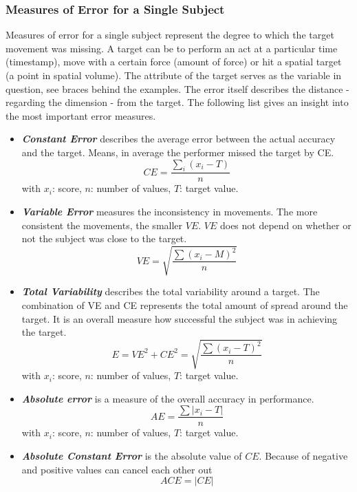 \subsubsection{Measures of Error for a Single Subject}
Measures of error for a single subject represent the degree to which the target movement was missing. A target can be to perform an act at a particular time (timestamp), move with a certain force (amount of force) or hit a spatial target (a point in spatial volume). The attribute of the target serves as the variable in question, see braces behind the examples. The error itself describes the distance - regarding the dimension - from the target. The following list gives an insight into the most important error measures.
\begin{itemize}
	\item \textbf{\textit{Constant Error}} describes the average error between the actual accuracy and the target. Means, in average the performer missed the target by CE.
	\begin{equation}
	CE=\frac{\sum_i(x_i-T)}{n}
	\end{equation}
	\label{eq:constanterror}
	with $x_i$: score, $n$: number of values, $T$: target value.
	\item \textbf{\textit{Variable Error}} measures the inconsistency in movements. The more consistent the movements, the smaller $VE$. $VE$ does not depend on whether or not the subject was close to the target.
	\begin{equation}
	VE=\sqrt{\frac{\sum(x_i-M)^2}{n}}    
	\end{equation}
	\item \textbf{\textit{Total Variability}} describes the total variability around a target. The combination of VE and CE represents the total amount of spread around the target. It is an overall measure how successful the subject was in achieving the target.
	\begin{equation}
	E=VE^2+CE^2=\sqrt{\frac{\sum(x_i-T)^2}{n}}
	\end{equation}
	with $x_i$: score, $n$: number of values, $T$: target value.
	\item \textbf{\textit{Absolute error}} is a measure of the overall accuracy in performance.
	\begin{equation}
	AE=\frac{\sum|x_i-T|}{n}
	\end{equation}
	with $x_i$: score, $n$: number of values, $T$: target value.
	\item \textbf{\textit{Absolute Constant Error}} is the absolute value of $CE$. Because of negative and positive values can cancel each other out
	\begin{equation}
	ACE = |CE|
	\end{equation}
\end{itemize}



